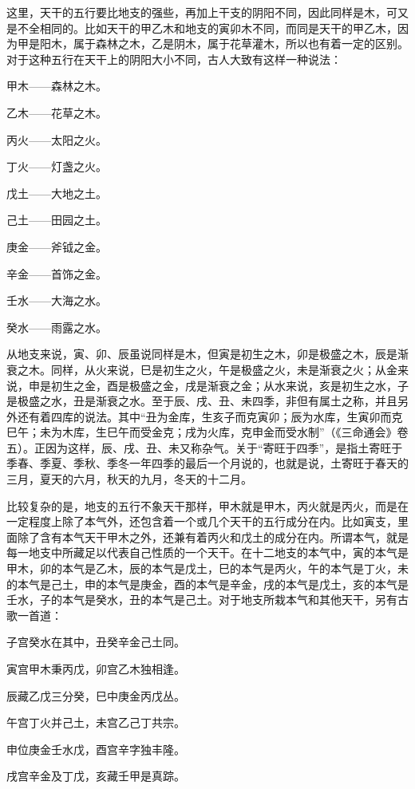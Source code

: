 \documentclass[a5paper,oneside,12pt]{ctexbook}
\begin{document}
这里，天干的五行要比地支的强些，再加上干支的阴阳不同，因此同样是木，可又是不全相同的。比如天干的甲乙木和地支的寅卯木不同，而同是天干的甲乙木，因为甲是阳木，属于森林之木，乙是阴木，属于花草灌木，所以也有着一定的区别。对于这种五行在天干上的阴阳大小不同，古人大致有这样一种说法：

甲木——森林之木。\par
乙木——花草之木。\par
丙火——太阳之火。\par
丁火——灯盏之火。\par
戊土——大地之土。\par
己土——田园之土。\par
庚金——斧钺之金。\par
辛金——首饰之金。\par
壬水——大海之水。\par
癸水——雨露之水。

从地支来说，寅、卯、辰虽说同样是木，但寅是初生之木，卯是极盛之木，辰是渐衰之木。同样，从火来说，巳是初生之火，午是极盛之火，未是渐衰之火；从金来说，申是初生之金，酉是极盛之金，戌是渐衰之金；从水来说，亥是初生之水，子是极盛之水，丑是渐衰之水。至于辰、戌、丑、未四季，非但有属土之称，并且另外还有着四库的说法。其中“丑为金库，生亥子而克寅卯；辰为水库，生寅卯而克巳午；未为木库，生巳午而受金克；戌为火库，克申金而受水制”（《三命通会》卷五）。正因为这样，辰、戌、丑、未又称杂气。关于“寄旺于四季”，是指土寄旺于季春、季夏、季秋、季冬一年四季的最后一个月说的，也就是说，土寄旺于春天的三月，夏天的六月，秋天的九月，冬天的十二月。

比较复杂的是，地支的五行不象天干那样，甲木就是甲木，丙火就是丙火，而是在一定程度上除了本气外，还包含着一个或几个天干的五行成分在内。比如寅支，里面除了含有本气天干甲木之外，还兼有着丙火和戊土的成分在内。所谓本气，就是每一地支中所藏足以代表自己性质的一个天干。在十二地支的本气中，寅的本气是甲木，卯的本气是乙木，辰的本气是戊土，巳的本气是丙火，午的本气是丁火，未的本气是己土，申的本气是庚金，酉的本气是辛金，戌的本气是戊土，亥的本气是壬水，子的本气是癸水，丑的本气是己土。对于地支所栽本气和其他天干，另有古歌一首道：
\begin{center}
子宫癸水在其中，丑癸辛金己土同。\par
寅宫甲木秉丙戊，卯宫乙木独相逢。\par
辰藏乙戊三分癸，巳中庚金丙戊丛。\par
午宫丁火并己土，未宫乙己丁共宗。\par
申位庚金壬水戊，酉宫辛字独丰隆。\par
戌宫辛金及丁戊，亥藏壬甲是真踪。\par  
\end{center}
\end{document}
